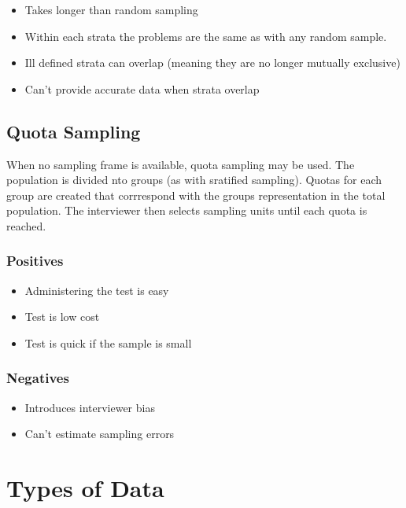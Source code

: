 \documentclass{article}
\begin{document}
\begin{itemize}

    \item Takes longer than random sampling 
    \item Within each strata the problems are the same as with any random sample.
    \item Ill defined strata can overlap (meaning they are no longer mutually
        exclusive) 
    \item Can't provide accurate data when strata overlap
    
\end{itemize}

\subsection{Quota Sampling}

When no sampling frame is available, quota sampling may be used. The population
is divided nto groups (as with sratified sampling). Quotas for each group are
created that corrrespond with the groups representation in the total population.
The interviewer then selects sampling units until each quota is reached.

\subsubsection{Positives}

\begin{itemize}

    \item Administering the test is easy 
    \item Test is low cost 
    \item Test is quick if the sample is small
    
\end{itemize}

\subsubsection{Negatives}

\begin{itemize}

    \item Introduces interviewer bias 
    \item Can't estimate sampling errors
    
\end{itemize}

\section{Types of Data}
\end{document}
